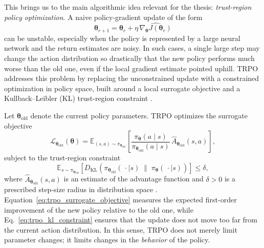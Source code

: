 This brings us to the main algorithmic idea relevant for the thesis: \emph{trust-region policy optimization}. A naive policy-gradient update of the form
\begin{equation}
\bm{\theta}_{r+1}
=
\bm{\theta}_{r}
+
\eta\,\widehat{\nabla_{\bm{\theta}} J(\bm{\theta}_{r})}
\label{eq:naive_policy_gradient_update}
\end{equation}
can be unstable, especially when the policy is represented by a large neural network and the return estimates are noisy. In such cases, a single large step may change the action distribution so drastically that the new policy performs much worse than the old one, even if the local gradient estimate pointed uphill. TRPO addresses this problem by replacing the unconstrained update with a constrained optimization in policy space, built around a local surrogate objective and a Kullback--Leibler (KL) trust-region constraint \cite{Schulman2015}.

Let $\bm{\theta}_{\mathrm{old}}$ denote the current policy parameters. TRPO optimizes the surrogate objective
\begin{equation}
\mathcal{L}_{\bm{\theta}_{\mathrm{old}}}(\bm{\theta})
=
\mathbb{E}_{(s,a)\sim\pi_{\bm{\theta}_{\mathrm{old}}}}
\left[
\frac{\pi_{\bm{\theta}}(a\mid s)}
{\pi_{\bm{\theta}_{\mathrm{old}}}(a\mid s)}
\,
\hat{A}_{\bm{\theta}_{\mathrm{old}}}(s,a)
\right],
\label{eq:trpo_surrogate_objective}
\end{equation}
subject to the trust-region constraint
\begin{equation}
\mathbb{E}_{s\sim\pi_{\bm{\theta}_{\mathrm{old}}}}
\left[
D_{\mathrm{KL}}
\!\left(
\pi_{\bm{\theta}_{\mathrm{old}}}(\,\cdot\mid s)
\;\|\;
\pi_{\bm{\theta}}(\,\cdot\mid s)
\right)
\right]
\leq
\delta,
\label{eq:trpo_kl_constraint}
\end{equation}
where $\hat{A}_{\bm{\theta}_{\mathrm{old}}}(s,a)$ is an estimate of the advantage function and $\delta>0$ is a prescribed step-size radius in distribution space \cite{Schulman2015}. Equation~\eqref{eq:trpo_surrogate_objective} measures the expected first-order improvement of the new policy relative to the old one, while Eq.~\eqref{eq:trpo_kl_constraint} ensures that the update does not move too far from the current action distribution. In this sense, TRPO does not merely limit parameter changes; it limits changes in the \emph{behavior} of the policy.

